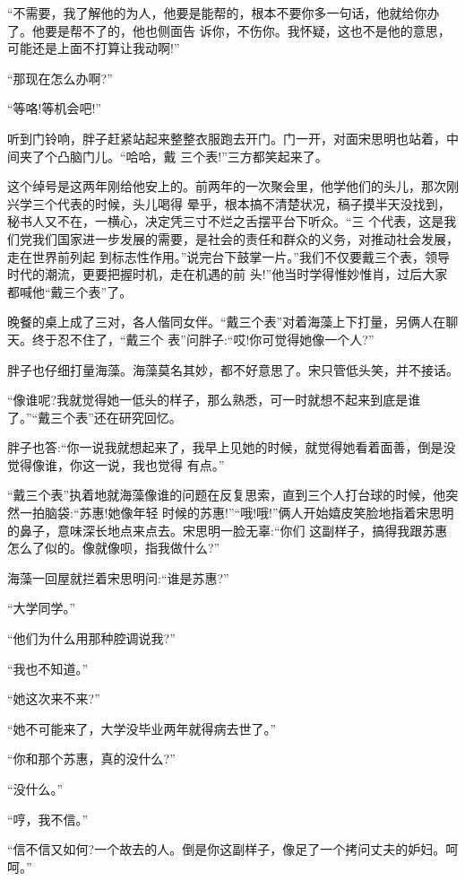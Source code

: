 \documentclass[11pt,a4paper,onecolumn]{article}
\begin{document}
``不需要，我了解他的为人，他要是能帮的，根本不要你多一句话，他就给你办了。他要是帮不了的，他也侧面告
诉你，不伤你。我怀疑，这也不是他的意思，可能还是上面不打算让我动啊!''

``那现在怎么办啊?''

``等咯!等机会吧!''

听到门铃响，胖子赶紧站起来整整衣服跑去开门。门一开，对面宋思明也站着，中间夹了个凸脑门儿。``哈哈，戴
三个表!''三方都笑起来了。

这个绰号是这两年刚给他安上的。前两年的一次聚会里，他学他们的头儿，那次刚兴学三个代表的时候，头儿喝得
晕乎，根本搞不清楚状况，稿子摸半天没找到，秘书人又不在，一横心，决定凭三寸不烂之舌摆平台下听众。``三
个代表，这是我们党我们国家进一步发展的需要，是社会的责任和群众的义务，对推动社会发展，走在世界前列起
到标志性作用。''说完台下鼓掌一片。''我们不仅要戴三个表，领导时代的潮流，更要把握时机，走在机遇的前
头!''他当时学得惟妙惟肖，过后大家都喊他``戴三个表''了。

晚餐的桌上成了三对，各人偕同女伴。``戴三个表''对着海藻上下打量，另俩人在聊天。终于忍不住了，``戴三个
表''问胖子:``哎!你可觉得她像一个人?''

胖子也仔细打量海藻。海藻莫名其妙，都不好意思了。宋只管低头笑，并不接话。

``像谁呢?我就觉得她一低头的样子，那么熟悉，可一时就想不起来到底是谁了。''``戴三个表''还在研究回忆。

胖子也答:``你一说我就想起来了，我早上见她的时候，就觉得她看着面善，倒是没觉得像谁，你这一说，我也觉得
有点。''

``戴三个表''执着地就海藻像谁的问题在反复思索，直到三个人打台球的时候，他突然一拍脑袋:``苏惠!她像年轻
时候的苏惠!''``哦!哦!''俩人开始嬉皮笑脸地指着宋思明的鼻子，意味深长地点来点去。宋思明一脸无辜:``你们
这副样子，搞得我跟苏惠怎么了似的。像就像呗，指我做什么?''

海藻一回屋就拦着宋思明问:``谁是苏惠?''

``大学同学。''

``他们为什么用那种腔调说我?''

``我也不知道。''

``她这次来不来?''

``她不可能来了，大学没毕业两年就得病去世了。''

``你和那个苏惠，真的没什么?''

``没什么。''

``哼，我不信。''

``信不信又如何?一个故去的人。倒是你这副样子，像足了一个拷问丈夫的妒妇。呵呵。''
\end{document}
